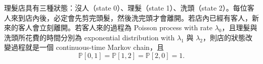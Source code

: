 \begin{example} \label{ex:barber_shop}
理髮店具有三種狀態：沒人（state 0）、理髮（state 1）、洗頭（state 2）。每位客人來到店內後，必定會先剪完頭髮，然後洗完頭才會離開。若店內已經有客人，新來的客人會立刻離開。若客人來的過程為 Poisson process with rate $ \lambda_{0} $，且理髮與洗頭所花費的時間分別為 exponential distribution with $ \lambda_{1} $ 與 $ \lambda_{2} $，則店的狀態改變過程就是一個 continuous-time Markov chain，且
\[ \mathbb{P}[0, 1] = \mathbb{P}[1, 2] = \mathbb{P}[2, 0] = 1. \]
\end{example}
